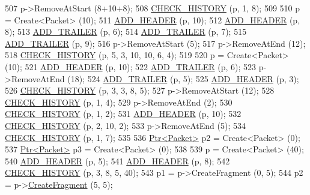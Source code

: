 \begin{DoxyCode}
507   p->RemoveAtStart (8+10+8);
508   \hyperlink{packet-metadata-test_8cc_a15a730e778d9d498a39e778bcd39684c}{CHECK\_HISTORY} (p, 1, 8);
509 
510   p = Create<Packet> (10);
511   \hyperlink{packet-metadata-test_8cc_a120012d48d29d678b3138d5c7b9bf714}{ADD\_HEADER} (p, 10);
512   \hyperlink{packet-metadata-test_8cc_a120012d48d29d678b3138d5c7b9bf714}{ADD\_HEADER} (p, 8);
513   \hyperlink{packet-metadata-test_8cc_ab10bc130bb7184d47509ea44f4fb24df}{ADD\_TRAILER} (p, 6);
514   \hyperlink{packet-metadata-test_8cc_ab10bc130bb7184d47509ea44f4fb24df}{ADD\_TRAILER} (p, 7);
515   \hyperlink{packet-metadata-test_8cc_ab10bc130bb7184d47509ea44f4fb24df}{ADD\_TRAILER} (p, 9);
516   p->RemoveAtStart (5);
517   p->RemoveAtEnd (12);
518   \hyperlink{packet-metadata-test_8cc_a15a730e778d9d498a39e778bcd39684c}{CHECK\_HISTORY} (p, 5, 3, 10, 10, 6, 4);
519 
520   p = Create<Packet> (10);
521   \hyperlink{packet-metadata-test_8cc_a120012d48d29d678b3138d5c7b9bf714}{ADD\_HEADER} (p, 10);
522   \hyperlink{packet-metadata-test_8cc_ab10bc130bb7184d47509ea44f4fb24df}{ADD\_TRAILER} (p, 6);
523   p->RemoveAtEnd (18);
524   \hyperlink{packet-metadata-test_8cc_ab10bc130bb7184d47509ea44f4fb24df}{ADD\_TRAILER} (p, 5);
525   \hyperlink{packet-metadata-test_8cc_a120012d48d29d678b3138d5c7b9bf714}{ADD\_HEADER} (p, 3);
526   \hyperlink{packet-metadata-test_8cc_a15a730e778d9d498a39e778bcd39684c}{CHECK\_HISTORY} (p, 3, 3, 8, 5);
527   p->RemoveAtStart (12);
528   \hyperlink{packet-metadata-test_8cc_a15a730e778d9d498a39e778bcd39684c}{CHECK\_HISTORY} (p, 1, 4);
529   p->RemoveAtEnd (2);
530   \hyperlink{packet-metadata-test_8cc_a15a730e778d9d498a39e778bcd39684c}{CHECK\_HISTORY} (p, 1, 2);
531   \hyperlink{packet-metadata-test_8cc_a120012d48d29d678b3138d5c7b9bf714}{ADD\_HEADER} (p, 10);
532   \hyperlink{packet-metadata-test_8cc_a15a730e778d9d498a39e778bcd39684c}{CHECK\_HISTORY} (p, 2, 10, 2);
533   p->RemoveAtEnd (5);
534   \hyperlink{packet-metadata-test_8cc_a15a730e778d9d498a39e778bcd39684c}{CHECK\_HISTORY} (p, 1, 7);
535 
536   \hyperlink{classns3_1_1Ptr}{Ptr<Packet>} p2 = Create<Packet> (0);
537   \hyperlink{classns3_1_1Ptr}{Ptr<Packet>} p3 = Create<Packet> (0);
538 
539   p = Create<Packet> (40);
540   \hyperlink{packet-metadata-test_8cc_a120012d48d29d678b3138d5c7b9bf714}{ADD\_HEADER} (p, 5);
541   \hyperlink{packet-metadata-test_8cc_a120012d48d29d678b3138d5c7b9bf714}{ADD\_HEADER} (p, 8);
542   \hyperlink{packet-metadata-test_8cc_a15a730e778d9d498a39e778bcd39684c}{CHECK\_HISTORY} (p, 3, 8, 5, 40);
543   p1 = p->CreateFragment (0, 5);
544   p2 = p->\hyperlink{classns3_1_1Packet_a16f6113606b355b2b346e2245fa2a3d0}{CreateFragment} (5, 5);

\end{DoxyCode}
